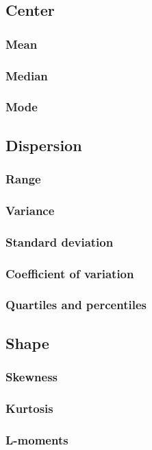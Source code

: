 \documentclass{report}
\begin{document}
	\subsection{Center}
	\subsubsection{Mean}
	\subsubsection{Median}
	\subsubsection{Mode}
	\subsection{Dispersion}
	\subsubsection{Range}
	\subsubsection{Variance}
	\subsubsection{Standard deviation}
	\subsubsection{Coefficient of variation}
	\subsubsection{Quartiles and percentiles}
	\subsection{Shape}
	\subsubsection{Skewness}
	\subsubsection{Kurtosis}
	\subsubsection{L-moments}
\end{document}
